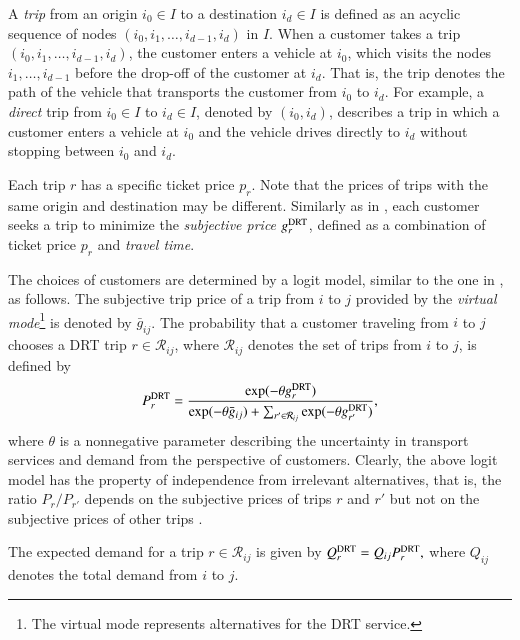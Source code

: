 \documentclass[dissertation,draft*]{aaltoseries}
\begin{document}
A \emph{trip} from an origin $i_0 \in I$ to a destination $i_d \in I$ is defined as an acyclic sequence of nodes 
$(i_0,i_1,\ldots,i_{d-1},i_d)$ in $I$.
When a customer takes a trip $(i_0,i_1,\ldots,i_{d-1},i_d)$, the customer enters a vehicle at $i_0$, which
visits the nodes $i_1,\ldots,i_{d-1}$ before the drop-off of the customer at $i_d$. That is, the
trip denotes the path of the vehicle that transports the customer from $i_0$ to $i_d$.
For example, a \emph{direct} trip from $i_0 \in I$ to $i_d \in I$, denoted by $(i_0,i_d)$, describes a trip in which a customer enters 
a vehicle at $i_0$ and the vehicle drives directly to $i_d$ without stopping between $i_0$ and $i_d$. 

Each trip $r$ has a specific ticket price $p_r$. 
Note that the prices of trips with the same origin and destination may be different.
Similarly as in \citep{yang2010}, each customer seeks a trip to minimize the \emph{subjective price} $g_r^{\rm DRT}$, 
defined as a combination of ticket price $p_r$ and \emph{travel time}. 

The choices of customers are determined by a logit model, similar to the one in \citep{yang2010}, as follows.
The subjective trip price of a trip from $i$ to $j$ provided by the \emph{virtual mode}\footnote{The virtual mode 
represents alternatives for the DRT service.} is denoted by $\bar{g}_{ij}$.
The probability that a customer traveling from $i$ to $j$ chooses a DRT trip $r \in \mathcal{R}_{ij}$, where $\mathcal{R}_{ij}$ denotes the 
set of trips from $i$ to $j$, is defined by
\begin{align}
\label{kysyntatn}
P_{r}^{\rm DRT} = 
\frac{\exp(-\theta g_{r}^{\rm DRT})}{\exp(-\theta \bar{g}_{ij}) + \sum_{r' \in \mathcal{R}_{ij}}\exp(-\theta g_{r'}^{\rm DRT})},
\end{align}
where $\theta$ is a nonnegative parameter describing the uncertainty in transport services and demand
from the perspective of customers.  
Clearly, the above logit model has the property of independence from irrelevant alternatives, that is, 
the ratio $P_{r}/P_{r'}$ depends on the subjective prices of trips $r$ and $r'$ but
not on the subjective prices of other trips \citep{small2007}.

The expected demand for a trip $r \in \mathcal{R}_{ij}$ is given by
$Q_{r}^{\rm DRT} = Q_{ij} P_{r}^{\rm DRT},$
where $Q_{ij}$ denotes the total demand from $i$ to $j$.
\end{document}

